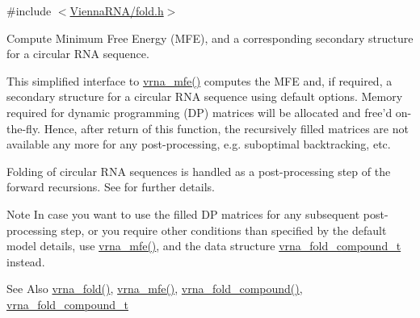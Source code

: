 {\ttfamily \#include $<$\hyperlink{fold_8h}{Vienna\-R\-N\-A/fold.\-h}$>$}



Compute Minimum Free Energy (M\-F\-E), and a corresponding secondary structure for a circular R\-N\-A sequence. 

This simplified interface to \hyperlink{group__mfe__fold_gabd3b147371ccf25c577f88bbbaf159fd}{vrna\-\_\-mfe()} computes the M\-F\-E and, if required, a secondary structure for a circular R\-N\-A sequence using default options. Memory required for dynamic programming (D\-P) matrices will be allocated and free'd on-\/the-\/fly. Hence, after return of this function, the recursively filled matrices are not available any more for any post-\/processing, e.\-g. suboptimal backtracking, etc.

Folding of circular R\-N\-A sequences is handled as a post-\/processing step of the forward recursions. See \cite{hofacker:2006} for further details.

\begin{DoxyNote}{Note}
In case you want to use the filled D\-P matrices for any subsequent post-\/processing step, or you require other conditions than specified by the default model details, use \hyperlink{group__mfe__fold_gabd3b147371ccf25c577f88bbbaf159fd}{vrna\-\_\-mfe()}, and the data structure \hyperlink{group__fold__compound_ga1b0cef17fd40466cef5968eaeeff6166}{vrna\-\_\-fold\-\_\-compound\-\_\-t} instead.
\end{DoxyNote}
\begin{DoxySeeAlso}{See Also}
\hyperlink{group__mfe__fold__single_gae7ca49ffb3086f145da36c964a7cec64}{vrna\-\_\-fold()}, \hyperlink{group__mfe__fold_gabd3b147371ccf25c577f88bbbaf159fd}{vrna\-\_\-mfe()}, \hyperlink{group__fold__compound_ga6601d994ba32b11511b36f68b08403be}{vrna\-\_\-fold\-\_\-compound()}, \hyperlink{group__fold__compound_ga1b0cef17fd40466cef5968eaeeff6166}{vrna\-\_\-fold\-\_\-compound\-\_\-t}
\end{DoxySeeAlso}

